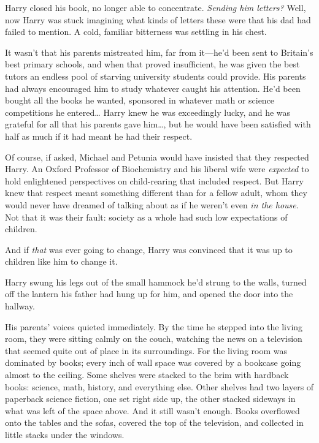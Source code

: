 Harry closed his book, no longer able to concentrate. \emph{Sending him letters?} Well, now Harry was stuck imagining what kinds of letters these were that his dad had failed to mention. A cold, familiar bitterness was settling in his chest.

It wasn't that his parents mistreated him, far from it---he'd been sent to Britain's best primary schools, and when that proved insufficient, he was given the best tutors an endless pool of starving university students could provide. His parents had always encouraged him to study whatever caught his attention. He'd been bought all the books he wanted, sponsored in whatever math or science competitions he entered{\ldots} Harry knew he was exceedingly lucky, and he was grateful for all that his parents gave him{\ldots}, but he would have been satisfied with half as much if it had meant he had their respect.

Of course, if asked, Michael and Petunia would have insisted that they respected Harry. An Oxford Professor of Biochemistry and his liberal wife were \emph{expected} to hold enlightened perspectives on child-rearing that included respect. But Harry knew that respect meant something different than for a fellow adult, whom they would never have dreamed of talking about as if he weren't even \emph{in the house}. Not that it was their fault: society as a whole had such low expectations of children.

And if \emph{that} was ever going to change, Harry was convinced that it was up to children like him to change it.

Harry swung his legs out of the small hammock he'd strung to the walls, turned off the lantern his father had hung up for him, and opened the door into the hallway.

His parents' voices quieted immediately. By the time he stepped into the living room, they were sitting calmly on the couch, watching the news on a television that seemed quite out of place in its surroundings. For the living room was dominated by books; every inch of wall space was covered by a bookcase going almost to the ceiling. Some shelves were stacked to the brim with hardback books: science, math, history, and everything else. Other shelves had two layers of paperback science fiction, one set right side up, the other stacked sideways in what was left of the space above. And it still wasn't enough. Books overflowed onto the tables and the sofas, covered the top of the television, and collected in little stacks under the windows.

